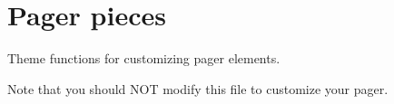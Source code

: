 \hypertarget{group__pagerpieces}{
\section{Pager pieces}
\label{group__pagerpieces}
}
Theme functions for customizing pager elements.

Note that you should NOT modify this file to customize your pager. 